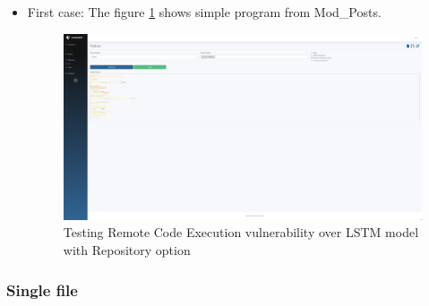 \begin{itemize}
    \item First case: The figure \ref{img:lstmreporce} shows simple program from Mod\_Posts.
    \begin{figure}[H]
        \centering
        \includegraphics[width=0.6\linewidth]{images/lstm-repo-rce.png}
        \caption{Testing Remote Code Execution vulnerability over LSTM model with Repository option}
        \label{img:lstmreporce}
    \end{figure}
\end{itemize}
\subsubsection{Single file}

